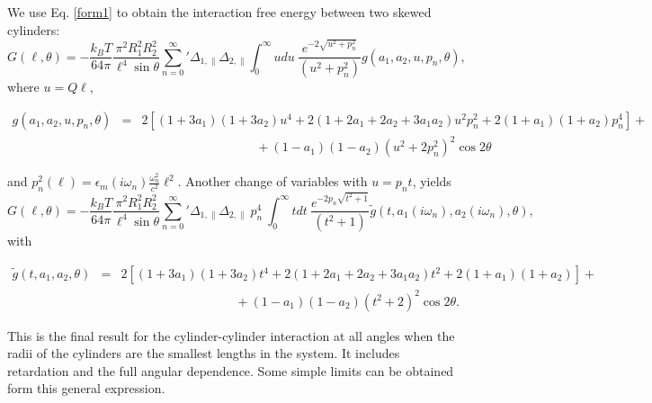 \documentclass[onecolumn,letterpaper,amsmath,amssymb,floatfix,aps,superscriptaddress]{revtex4}
\begin{document}
We use  Eq. \ref{form1} to obtain the interaction free energy between two skewed cylinders:
\begin{equation}
G(\ell,\theta) = - \frac{k_BT}{64 \pi} \frac{ \pi^2 R_1^{2} R_2^{2} }{\ell^{4} \sin{\theta}} {\sum_{n=0}^{\infty}}' \Delta_{1,\parallel} \Delta_{2,\parallel} \int_0^{\infty}  u du ~\frac{e^{- 2 \sqrt{u^{2} + p_n^{2}}}}{(u^{2} + p_n^{2})}  g(a_1, a_2, u, p_n, \theta),
\label{pars-3}
\end{equation}
where $u = Q \ell$,  
\begin{widetext}
\begin{eqnarray}
g(a_1, a_2, u, p_n, \theta) &=&  2 \left[ (1+3a_1)(1+3a_2) u^{4} + 2(1+2a_1+2a_2+3a_1a_2) u^{2}p_n^{2}  + 2(1+a_1)(1+a_2) p_n^{4}\right] + \nonumber \\ 
& & ~~~~~~~~~~~~~~~~~~~~~~~~~~~~~~~~~~~~~~~~~ + (1-a_1)(1-a_2)(u^{2} + 2 p_n^{2})^2 \cos 2\theta
\end{eqnarray}
\end{widetext}
and $p_n^{2}(\ell) =  \epsilon_m(i \omega_n) \frac{\omega_n^{2}}{c^{2}} \ell^{2}$. Another change of variables with $u = p_n t$, yields 
\begin{equation}
G(\ell,\theta) = - \frac{k_BT}{64 \pi} \frac{ \pi^2 R_1^{2} R_2^{2} }{\ell^{4} \sin{\theta}} {\sum_{n=0}^{\infty}}' \Delta_{1,\parallel} \Delta_{2,\parallel} ~p_n^{4} ~\int_0^{\infty} t dt ~\frac{e^{- 2 p_n \sqrt{t^{2} + 1}}}{(t^{2} + 1)} \tilde g(t, a_1(i \omega_n), a_2(i \omega_n), \theta),
\label{pars-31}
\end{equation}
with
\begin{widetext}
\begin{eqnarray}
\tilde g(t, a_1, a_2, \theta) &=& 2 \left[ (1+3a_1)(1+3a_2) t^{4} + 2 (1+2a_1+2a_2+3a_1a_2) t^{2}  + 2(1+a_1)(1+a_2)\right] + \nonumber \\
& & ~~~~~~~~~~~~~~~~~~~~~~~~~~~~~~~~~~~~~~~~~ + (1-a_1)(1-a_2)(t^{2} + 2)^2 \cos 2\theta.
\end{eqnarray}
\end{widetext}
This is the final result for the cylinder-cylinder interaction at all angles when the radii of the cylinders are the smallest lengths in the system. It includes retardation and the full angular dependence. Some simple limits can be obtained form this general expression.
\end{document}
